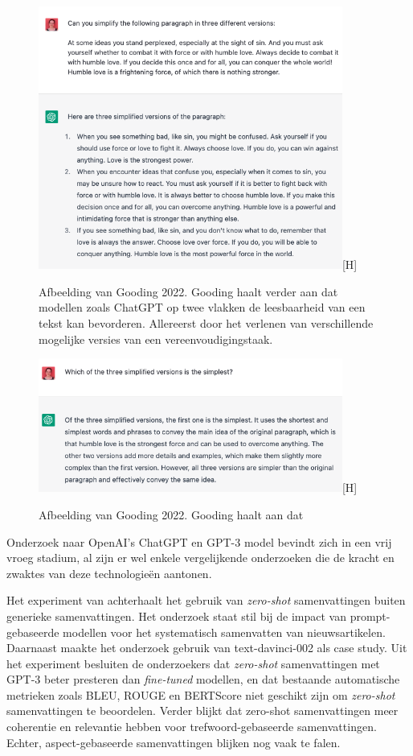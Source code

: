 \begin{figure}
	\includegraphics[width=10cm]{img/chatgpt-example-different-versions-gooding.png}[H]
	\caption{Afbeelding van Gooding 2022. Gooding haalt verder aan dat modellen zoals ChatGPT op twee vlakken de leesbaarheid van een tekst kan bevorderen. Allereerst door het verlenen van verschillende mogelijke versies van een vereenvoudigingstaak.}
\end{figure}

\begin{figure}
	\includegraphics[width=10cm]{img/chatgpt-example-evaluation-gooding.png}[H]
	\caption{Afbeelding van Gooding 2022. Gooding haalt aan dat }
\end{figure}



Onderzoek naar OpenAI's ChatGPT en GPT-3 model bevindt zich in een vrij vroeg stadium, al zijn er wel enkele vergelijkende onderzoeken die de kracht en zwaktes van deze technologieën aantonen.

Het experiment van \textcite{Goyal2022} achterhaalt het gebruik van \textit{zero-shot} samenvattingen buiten generieke samenvattingen. Het onderzoek staat stil bij de impact van prompt-gebaseerde modellen voor het systematisch samenvatten van nieuwsartikelen. Daarnaast maakte het onderzoek gebruik van text-davinci-002 als case study. Uit het experiment besluiten de onderzoekers dat \textit{zero-shot} samenvattingen met GPT-3 beter presteren dan \textit{fine-tuned} modellen, en dat bestaande automatische metrieken zoals BLEU, ROUGE en BERTScore niet geschikt zijn om \textit{zero-shot} samenvattingen te beoordelen. Verder blijkt dat zero-shot samenvattingen meer coherentie en relevantie hebben voor trefwoord-gebaseerde samenvattingen. Echter, aspect-gebaseerde samenvattingen blijken nog vaak te falen.

